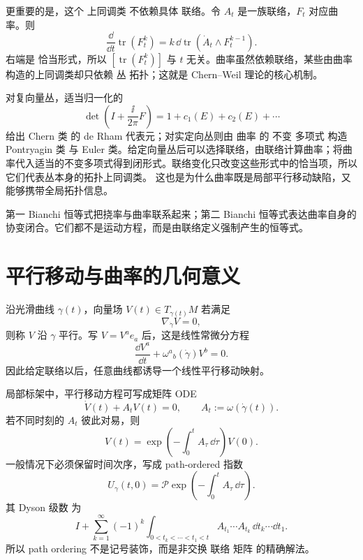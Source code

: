 更重要的是，这个 上同调类 不依赖具体 联络。令 $A_t$ 是一族联络，$F_t$ 对应曲率。则
\begin{equation}
\frac{\dd}{\dd t}\operatorname{tr}(F_t^k)
=k\,\dd\operatorname{tr}
\left(\dot A_t\wedge F_t^{k-1}\right).
\label{eq:chern-weil-transgression}
\end{equation}
右端是 恰当形式，所以 $[\operatorname{tr}(F_t^k)]$ 与 $t$ 无关。曲率虽然依赖联络，某些由曲率构造的上同调类却只依赖 丛 拓扑；这就是 Chern--Weil 理论的核心机制。

对复向量丛，适当归一化的
\[
\det\left(I+\frac{\ii}{2\pi}F\right)
=1+c_1(E)+c_2(E)+\cdots
\]
给出 Chern 类 的 de Rham 代表元；对实定向丛则由 曲率 的 不变 多项式 构造 Pontryagin 类 与 Euler 类。给定向量丛后可以选择联络，由联络计算曲率；将曲率代入适当的不变多项式得到闭形式。联络变化只改变这些形式中的恰当项，所以它们代表丛本身的拓扑上同调类。
这也是为什么曲率既是局部平行移动缺陷，又能够携带全局拓扑信息。

第一 Bianchi 恒等式把挠率与曲率联系起来；第二 Bianchi 恒等式表达曲率自身的协变闭合。它们都不是运动方程，而是由联络定义强制产生的恒等式。




\section{平行移动与曲率的几何意义}
沿光滑曲线 $\gamma(t)$，向量场 $V(t)\in T_{\gamma(t)}M$ 若满足
\begin{equation*}\nabla_{\dot\gamma}V=0,
\end{equation*}
则称 $V$ 沿 $\gamma$ 平行。写 $V=V^ae_a$ 后，这是线性常微分方程
\[
\frac{\dd V^a}{\dd t}
+\omega^a{}_b(\dot\gamma)V^b=0.
\]
因此给定联络以后，任意曲线都诱导一个线性平行移动映射。

局部标架中，平行移动方程可写成矩阵 ODE
\begin{equation}
\dot V(t)+A_tV(t)=0,
\qquad
A_t:=\omega(\dot\gamma(t)).
\label{eq:parallel-matrix-ode}
\end{equation}
若不同时刻的 $A_t$ 彼此对易，则
\[
V(t)=\exp\left(-\int_0^tA_\tau\,\dd\tau\right)V(0).
\]
一般情况下必须保留时间次序，写成 path-ordered 指数
\begin{equation*}U_\gamma(t,0)
=\mathcal P\exp\left(-\int_0^tA_\tau\,\dd\tau\right).\end{equation*}
其 Dyson 级数 为
\[
I+
\sum_{k=1}^\infty(-1)^k
\int_{0<t_k<\cdots<t_1<t}
A_{t_1}\cdots A_{t_k}
\,\dd t_k\cdots\dd t_1.
\]
所以 path ordering 不是记号装饰，而是非交换 联络 矩阵 的精确解法。

